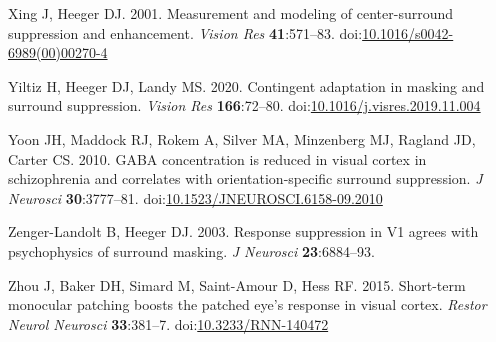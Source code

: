 \documentclass[]{article}
\begin{document}
\leavevmode\hypertarget{ref-Xing2001}{}%
Xing J, Heeger DJ. 2001. Measurement and modeling of center-surround suppression and enhancement. \emph{Vision Res} \textbf{41}:571--83. doi:\href{https://doi.org/10.1016/s0042-6989(00)00270-4}{10.1016/s0042-6989(00)00270-4}

\leavevmode\hypertarget{ref-Yiltiz2020}{}%
Yiltiz H, Heeger DJ, Landy MS. 2020. Contingent adaptation in masking and surround suppression. \emph{Vision Res} \textbf{166}:72--80. doi:\href{https://doi.org/10.1016/j.visres.2019.11.004}{10.1016/j.visres.2019.11.004}

\leavevmode\hypertarget{ref-Yoon2010}{}%
Yoon JH, Maddock RJ, Rokem A, Silver MA, Minzenberg MJ, Ragland JD, Carter CS. 2010. GABA concentration is reduced in visual cortex in schizophrenia and correlates with orientation-specific surround suppression. \emph{J Neurosci} \textbf{30}:3777--81. doi:\href{https://doi.org/10.1523/JNEUROSCI.6158-09.2010}{10.1523/JNEUROSCI.6158-09.2010}

\leavevmode\hypertarget{ref-Zenger-Landolt2003}{}%
Zenger-Landolt B, Heeger DJ. 2003. Response suppression in V1 agrees with psychophysics of surround masking. \emph{J Neurosci} \textbf{23}:6884--93.

\leavevmode\hypertarget{ref-Zhou2015}{}%
Zhou J, Baker DH, Simard M, Saint-Amour D, Hess RF. 2015. Short-term monocular patching boosts the patched eye's response in visual cortex. \emph{Restor Neurol Neurosci} \textbf{33}:381--7. doi:\href{https://doi.org/10.3233/RNN-140472}{10.3233/RNN-140472}
\end{document}
